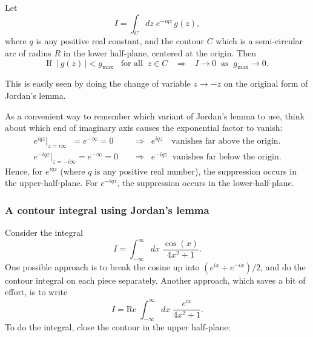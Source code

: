 \documentclass[10pt,a4paper]{article}
\begin{document}
\begin{framed}
\noindent
Let
\begin{equation}
I = \int_C dz \; e^{-iqz} \,g(z),
\end{equation}
where $q$ is any positive real constant, and the contour $C$ which is
a semi-circular arc of radius $R$ in the lower half-plane, centered at
the origin. Then
\begin{equation}
\text{If}\;\; \big|\,g(z)\,\big| < g_{\mathrm{max}} \;\;\;\text{for all}\;\;z \in C \;\;\;\Rightarrow \;\;\; I \rightarrow 0 \;\;\mathrm{as}\;\; g_{\mathrm{max}} \rightarrow 0.
\end{equation}
\end{framed}

\noindent
This is easily seen by doing the change of variable $z \rightarrow -z$
on the original form of Jordan's lemma.

As a convenient way to remember which variant of Jordan's lemma to
use, think about which end of imaginary axis causes the exponential
factor to vanish:
\begin{align*}
  e^{iqz}\big|_{z = i\infty}\;\; = e^{-\infty} = 0\quad &
  \Rightarrow \;\; e^{iqz} \;\;\;\,\text{vanishes far above the origin}. \\
  e^{-iqz}\big|_{z = -i\infty} = e^{-\infty} = 0\quad &
  \Rightarrow \;\; e^{-iqz} \;\;\textrm{vanishes far below the origin}.
\end{align*}
Hence, for $e^{iqz}$ (where $q$ is any positive real number), the
suppression occurs in the upper-half-plane. For $e^{-iqz}$, the
suppression occurs in the lower-half-plane.


\subsubsection{A contour integral using Jordan's lemma}
\label{a-contour-integral-using-jordans-lemma}

Consider the integral
\begin{equation}
I = \int_{-\infty}^\infty dx\; \frac{\cos(x)}{4x^2 + 1}.
\end{equation}
One possible approach is to break the cosine up into
$(e^{ix} + e^{-ix})/2$, and do the contour integral on each piece
separately. Another approach, which saves a bit of effort, is to write
\begin{equation}
I = \mathrm{Re} \; \int_{-\infty}^\infty dx\; \frac{e^{ix}}{4x^2 + 1}.
\end{equation}
To do the integral, close the contour in the upper half-plane:
\end{document}
